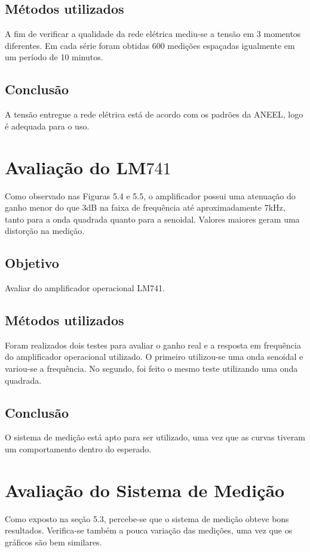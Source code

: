 \documentclass[14pt, oneside]{book}
\newcommand\tab[1][1cm]{\hspace*{#1}}
\theoremstyle{definition}
\begin{document}
                \subsection{Métodos utilizados}
                    \tab A fim de verificar a qualidade da rede elétrica mediu-se a tensão em 3 momentos diferentes. Em cada série foram obtidas 600 medições espaçadas igualmente em um período de 10 minutos.
                 \subsection{Conclusão}
                    \tab A tensão entregue a rede elétrica está de acordo com os padrões da ANEEL, logo é adequada para o uso. \\
            
            \section{Avaliação do LM$741$}
                \tab Como observado nas Figuras 5.4 e 5.5, o amplificador possui uma atenuação do ganho menor do que 3dB na faixa de frequência até aproximadamente 7kHz, tanto para a onda quadrada quanto para a senoidal. Valores maiores geram uma distorção na medição.
                \subsection{Objetivo}
                    \tab Avaliar do amplificador operacional LM741.
                \subsection{Métodos utilizados}
                    \tab Foram realizados dois testes para avaliar o ganho real e a resposta em frequência do amplificador operacional utilizado. O primeiro utilizou-se uma onda senoidal e variou-se a frequência. No segundo, foi feito o mesmo teste utilizando uma onda quadrada.
                 \subsection{Conclusão}
                    \tab O sistema de medição está apto para ser utilizado, uma vez que as curvas tiveram um comportamento dentro do esperado. \\
                
            \section{Avaliação do Sistema de Medição}
                \tab Como exposto na seção 5.3, percebe-se que o sistema de medição obteve bons resultados. Verifica-se também a pouca variação das medições, uma vez que os gráficos são bem similares. \\
\end{document}
